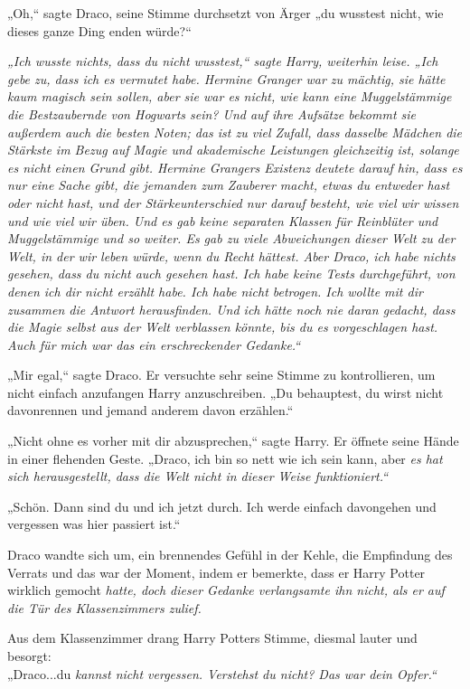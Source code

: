 {„Oh,“ sagte Draco, seine Stimme durchsetzt von Ärger „du wusstest nicht, wie dieses ganze Ding enden würde?“

\emph{„Ich wusste nichts, dass du nicht wusstest,“ sagte Harry, weiterhin leise. „Ich gebe zu, dass ich es vermutet habe. Hermine Granger war zu mächtig, sie hätte kaum magisch sein sollen, aber sie war es nicht, wie kann eine Muggelstämmige die Bestzaubernde von Hogwarts sein? Und auf ihre Aufsätze bekommt sie außerdem auch die besten Noten; das ist zu viel Zufall, dass dasselbe Mädchen die Stärkste im Bezug auf Magie und akademische Leistungen gleichzeitig ist, solange es nicht einen Grund gibt. Hermine Grangers Existenz deutete darauf hin, dass es nur eine Sache gibt, die jemanden zum Zauberer macht, etwas du entweder hast oder nicht hast, und der Stärkeunterschied nur darauf besteht, wie viel wir wissen und wie viel wir üben. Und es gab keine separaten Klassen für Reinblüter und Muggelstämmige und so weiter. Es gab zu viele Abweichungen dieser Welt zu der Welt, in der wir leben würde, wenn du Recht hättest. Aber Draco, ich habe nichts gesehen, dass du nicht auch gesehen hast. Ich habe keine Tests durchgeführt, von denen ich dir nicht erzählt habe. Ich habe nicht betrogen. Ich wollte mit dir zusammen die Antwort herausfinden. Und ich hätte noch nie daran gedacht, dass die Magie selbst aus der Welt verblassen könnte, bis du es vorgeschlagen hast. Auch für mich war das ein erschreckender Gedanke.“}

„Mir egal,“ sagte Draco. Er versuchte sehr seine Stimme zu kontrollieren, um nicht einfach anzufangen Harry anzuschreiben. „Du behauptest, du wirst nicht davonrennen und jemand anderem davon erzählen.“

„Nicht ohne es vorher mit dir abzusprechen,“ sagte Harry. Er öffnete seine Hände in einer flehenden Geste. „Draco, ich bin so nett wie ich sein kann, aber \emph{es hat sich herausgestellt, dass die Welt nicht in dieser Weise funktioniert.“}

„Schön. Dann sind du und ich jetzt durch. Ich werde einfach davongehen und vergessen was hier passiert ist.“

Draco wandte sich um, ein brennendes Gefühl in der Kehle, die Empfindung des Verrats und das war der Moment, indem er bemerkte, dass er Harry Potter wirklich gemocht \emph{hatte, doch dieser Gedanke verlangsamte ihn nicht, als er auf die Tür des Klassenzimmers zulief.}

Aus dem Klassenzimmer drang Harry Potters Stimme, diesmal lauter und besorgt:\\ „Draco...du \emph{kannst nicht vergessen. Verstehst du nicht? Das war dein Opfer.“}

}
